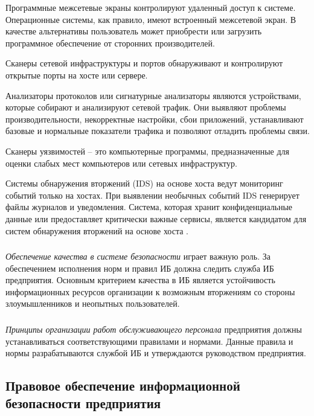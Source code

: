 Программные межсетевые экраны контролируют удаленный доступ к системе. Операционные системы, как правило, имеют встроенный межсетевой экран. В качестве альтернативы пользователь может приобрести или загрузить программное обеспечение от сторонних производителей.

Сканеры сетевой инфраструктуры и портов обнаруживают и контролируют открытые порты на хосте или сервере.

Анализаторы протоколов или сигнатурные анализаторы являются устройствами, которые собирают и анализируют сетевой трафик. Они выявляют проблемы производительности, некорректные настройки, сбои приложений, устанавливают базовые и нормальные показатели трафика и позволяют отладить проблемы связи.

Сканеры уязвимостей -- это компьютерные программы, предназначенные для оценки слабых мест компьютеров или сетевых инфраструктур.

Системы обнаружения вторжений (IDS) на основе хоста ведут мониторинг событий только на хостах. При выявлении необычных событий IDS генерирует файлы журналов и уведомления. Система, которая хранит конфиденциальные данные или предоставляет критически важные сервисы, является кандидатом для систем обнаружения вторжений на основе хоста \cite{cisco_software_security}.

\subsubsection{}
\label{subsubsec:measures:techical:qa}

\textit{Обеспечение качества в системе безопасности} играет важную роль.
За обеспечением исполнения норм и правил ИБ должна следить служба ИБ предприятия.
Основным критерием качества в ИБ является устойчивость информационных ресурсов организации к возможным вторжениям со стороны злоумышленников и неопытных пользователей.

\subsubsection{}
\label{subsubsec:measures:technical:service_staff}

\textit{Принципы организации работ обслуживающего персонала} предприятия должны устанавливаться соответствующими правилами и нормами.
Данные правила и нормы разрабатываются службой ИБ и утверждаются руководством предприятия.

\subsection{Правовое обеспечение информационной безопасности предприятия}
\label{subsec:measures:law}


